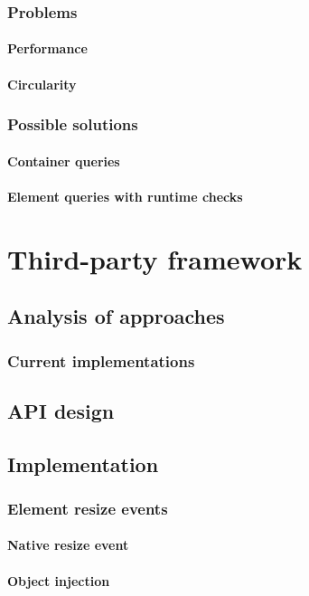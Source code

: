\documentclass[a4paper,11pt]{kth-mag}
\begin{document}
      
      \section{Problems}
        \subsection{Performance}
        \subsection{Circularity}
      \section{Possible solutions}
        \subsection{Container queries}
        \subsection{Element queries with runtime checks}
  \part{Third-party framework}
    \chapter{Analysis of approaches}
    \section{Current implementations}
    \chapter{API design}
    \chapter{Implementation}
      \section{Element resize events}
        \subsection{Native resize event}
        \subsection{Object injection}
\end{document}

